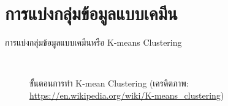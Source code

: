 \section{การแบ่งกลุ่มข้อมูลแบบเคมีน}

การแบ่งกลุ่มข้อมูลแบบเคมีนหรือ K-means Clustering

\begin{figure}[H]
    \centering
    \\
    \caption{ขั้นตอนการทำ K-mean Clustering (เครดิตภาพ: \url{https://en.wikipedia.org/wiki/K-means_clustering})}
    \label{fig:k_mean}
\end{figure}
 
